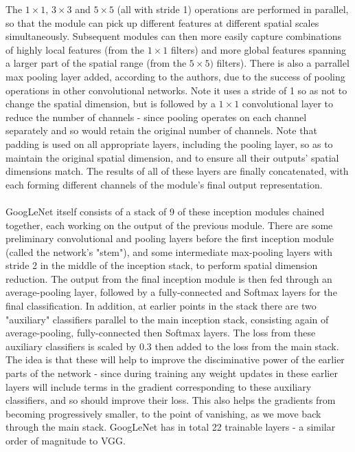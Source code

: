 \documentclass[11pt]{article} %
\theoremstyle{plain}
\theoremstyle{definition}
\begin{document}
The \(1 \times 1\), \(3 \times 3\) and \(5 \times 5\) (all with stride 1) operations are performed in parallel, so that the module can pick up different features at different spatial scales simultaneously. Subsequent modules can then more easily capture combinations of highly local features (from the \(1 \times 1\) filters) and more global features spanning a larger part of the spatial range (from the \(5 \times 5)\) filters). There is also a parrallel max pooling layer added, according to the authors, due to the success of pooling operations in other convolutional networks. Note it uses a stride of 1 so as not to change the spatial dimension, but is followed by a \(1 \times 1\) convolutional layer to reduce the number of channels - since pooling operates on each channel separately and so would retain the original number of channels. Note that padding is used on all appropriate layers, including the pooling layer, so as to maintain the original spatial dimension, and to ensure all their outputs' spatial dimensions match. The results of all of these layers are finally concatenated, with each forming different channels of the module's final output representation.
\\
\\
\noindent
GoogLeNet itself consists of a stack of 9 of these inception modules chained together, each working on the output of the previous module. There are some preliminary convolutional and pooling layers before the first inception module (called the network's "stem"), and some intermediate max-pooling layers with stride 2 in the middle of the inception stack, to perform spatial dimension reduction. The output from the final inception module is then fed through an average-pooling layer, followed by a fully-connected and Softmax layers for the final classification. In addition, at earlier points in the stack there are two "auxiliary" classifiers parallel to the main inception stack, consisting again of average-pooling, fully-connected then Softmax layers. The loss from these auxiliary classifiers is scaled by 0.3 then added to the loss from the main stack. The idea is that these will help to improve the disciminative power of the earlier parts of the network - since during training any weight updates in these earlier layers will include terms in the gradient corresponding to these auxiliary classifiers, and so should improve their loss. This also helps the gradients from becoming progressively smaller, to the point of vanishing, as we move back through the main stack. GoogLeNet has in total 22 trainable layers - a similar order of magnitude to VGG.
\end{document}
